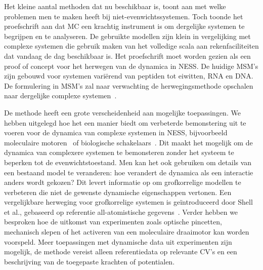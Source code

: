 Het kleine aantal methoden dat nu beschikbaar is, toont aan met welke problemen men te maken heeft bij niet-evenwichtssystemen. Toch toonde het proefschrift aan dat MC een krachtig instrument is om dergelijke systemen te begrijpen en te \mbox{ana}lyseren. De gebruikte modellen zijn klein in vergelijking met complexe systemen die gebruik maken van het volledige scala aan rekenfaciliteiten dat vandaag de dag beschikbaar is. Het proefschrift moet worden gezien als een proof of concept voor het herwegen van de dynamica in NESS. De huidige MSM's zijn gebouwd voor systemen variërend van peptiden tot eiwitten, RNA en DNA. De formulering in MSM's zal naar verwachting de herwegingsmethode opschalen naar dergelijke complexe systemen~\cite{schutte2015critical}.
 
De methode heeft een grote verscheidenheid aan mogelijke toepassingen. We hebben uitgelegd hoe het een manier biedt om verbeterde bemonstering uit te voeren voor de dynamica van complexe systemen in NESS, bijvoorbeeld moleculaire motoren~\cite{schliwa2003molecular} of biologische schakelaars~\cite{goldbeter1997biochemical}. Dit maakt het mogelijk om de dynamica van complexere systemen te bemonsteren zonder het systeem te beperken tot de evenwichtstoestand. Men kan het ook gebruiken om details van een bestaand model te veranderen: hoe verandert de dynamica als een interactie anders wordt gekozen? Dit levert informatie op om grofkorrelige modellen te verbeteren die niet de gewenste dynamische eigenschappen vertonen.  Een vergelijkbare herweging voor grofkorrelige systemen is geïntroduceerd door Shell et al., gebaseerd op referentie all-atomistische gegevens~\cite{chaimovich2010relative}. Verder hebben we besproken hoe de uitkomst van experimenten zoals optische pincetten, mechanisch slepen of het activeren van een moleculaire draaimotor kan worden voorspeld. Meer toepassingen met dynamische data uit experimenten zijn mogelijk, de methode vereist alleen referentiedata op relevante CV's en een beschrijving van de toegepaste krachten of potentialen.
  
% 
% 
% 
% 
  

